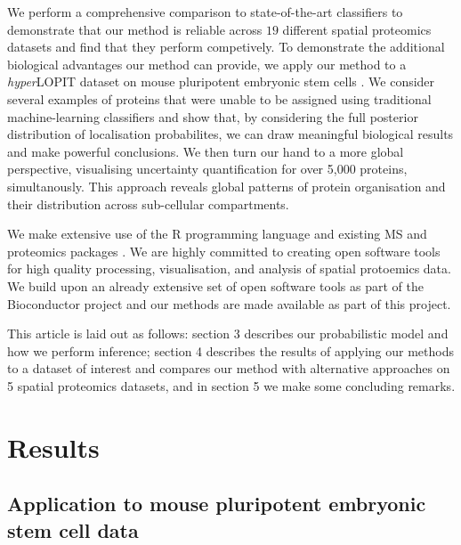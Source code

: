 \documentclass[12pt,english]{article}\usepackage[]{graphicx}\usepackage[]{color}
\begin{document}
We perform a comprehensive comparison to state-of-the-art classifiers to demonstrate that our method is reliable across $19$ different spatial proteomics datasets and find that they perform competively. To demonstrate
the additional biological advantages our method can provide, we apply our method to a \textit{hyper}LOPIT
dataset on mouse pluripotent embryonic stem cells \citep{hyper}. We consider several examples of proteins
that were unable to be assigned using traditional machine-learning classifiers and show that, by considering
the full posterior distribution of localisation probabilites, we can draw meaningful biological results and
make powerful conclusions. We then turn our hand to a more global perspective, visualising uncertainty quantification for over 5,000 proteins, simultanously. This approach reveals global patterns of protein organisation and their distribution across sub-cellular compartments.

We make extensive use of the R programming language \citep{R} and
existing MS and proteomics packages \citep{MSnbase:2012,
  pRoloc:2014}. We are highly committed to creating open software
tools for high quality processing, visualisation, and analysis of
spatial protoemics data.  We build upon an already extensive set of
open software tools \citep{pRoloc:2014} as part of the Bioconductor
project \citep{Bioconductor::2004, Huber::2015} and our methods are
made available as part of this project.

This article is laid out as follows: section 3 describes our probabilistic model and
how we perform inference; section 4 describes the results of applying our methods to a dataset of interest
and compares our method with alternative approaches on 5 spatial proteomics datasets, and in section 5 we make some
concluding remarks.

\section{Results}

\subsection{Application to mouse pluripotent embryonic stem cell data}
\end{document}
